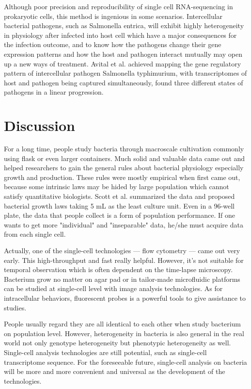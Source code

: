 \documentclass[fleqn,10pt]{wlscirep}
\begin{document}
Although poor precision and reproducibility of single cell RNA-sequencing in prokaryotic cells, this method is ingenious in some scenarios. Intercellular bacterial pathogens, such as Salmonella entrica, will exhibit highly heterogeneity in physiology after infected into host cell which have a major consequences for the infection outcome, and to know how the pathogens change their gene expression patterns and how the host and pathogen interact mutually may open up a new ways of treatment\cite{Avital2017,Saliba2016}. Avital et al.\cite{Avital2017} achieved mapping the gene regulatory pattern of intercellular pathogen Salmonella typhimurium, with transcriptomes of host and pathogen being captured simultaneously, found three different states of pathogens in a linear progression.

\section[]{Discussion}

For a long time, people study bacteria through macroscale cultivation commonly using flask or even larger containers. Much solid and valuable data came out and helped researchers to gain the general rules about bacterial physiology especially growth and production\cite{Monod1949,Zwietering1990,Kargi2009}. These rules were mostly empirical when first came out, because some intrinsic laws may be hided by large population which cannot satisfy quantitative biologists. Scott et al.\cite{Scott2010} summarized the data and proposed bacterial growth laws taking 5 mL as the least culture unit. Even in a 96-well plate, the data that people collect is a form of population performance. If one wants to get  more "individual" and "inseparable" data, he/she must acquire data from each single cell.

Actually, one of the single-cell technologies --- flow cytometry --- came out very early\cite{Fulwyler1965}. This high-throughput and fast really helpful. However, it's not suitable for temporal observation which is often dependent on the time-lapse microscopy. Bacterium grow no matter on agar pad\cite{Young2012} or in tailor-made microfluidic platforms\cite{Wang2010,Moffitt2012} can be studied at single-cell level with image analysis technologies. As for intracellular behaviors, fluorescent probes is a powerful tools to give assistance to studies\cite{Balleza2018}.

People usually regard they are all identical to each other when study bacterium on population level. However, heterogeneity in bacteria is also general in the real world not only genotype heterogeneity\cite{Gurjav2016} but phenotypic heterogeneity\cite{Ackermann2015} as well. Single-cell analysis technologies are still potential, such as single-cell transcriptome sequence\cite{Zhang2018}. For the foreseeable future, single-cell analysis on bacteria will be more and more convenient and universal as the development of the technologies.
\end{document}
